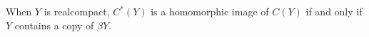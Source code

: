 When $Y$ is realcompact, $C^*(Y)$ is a homomorphic image of $C(Y)$ if and only if $Y$ contains a copy of $\beta Y$.
